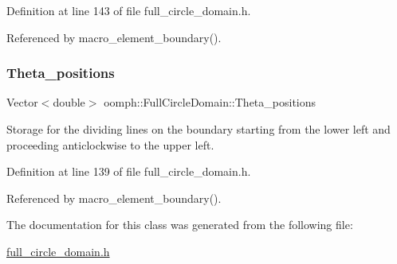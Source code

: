 Definition at line 143 of file full\+\_\+circle\+\_\+domain.\+h.



Referenced by macro\+\_\+element\+\_\+boundary().

\mbox{\label{classoomph_1_1FullCircleDomain_ab995977e0da3045269da04fb15fd2cb6}} 
\subsubsection{\texorpdfstring{Theta\+\_\+positions}{Theta\_positions}}
{\footnotesize\ttfamily Vector$<$double$>$ oomph\+::\+Full\+Circle\+Domain\+::\+Theta\+\_\+positions\hspace{0.3cm}{\ttfamily [private]}}



Storage for the dividing lines on the boundary starting from the lower left and proceeding anticlockwise to the upper left. 



Definition at line 139 of file full\+\_\+circle\+\_\+domain.\+h.



Referenced by macro\+\_\+element\+\_\+boundary().



The documentation for this class was generated from the following file\+:\begin{DoxyCompactItemize}
\item 
\hyperlink{full__circle__domain_8h}{full\+\_\+circle\+\_\+domain.\+h}\end{DoxyCompactItemize}
